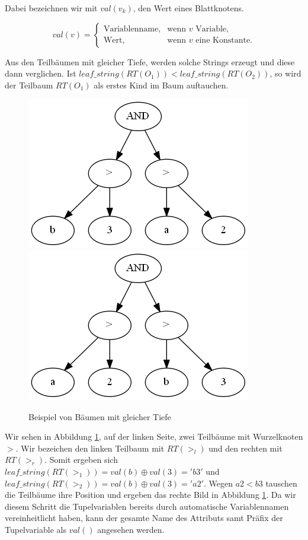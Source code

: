 Dabei bezeichnen wir mit $\mathit{val}(v_k)$, den Wert eines Blattknotens.

$$
val(v)=\begin{cases}
  \text{Variablenname},  & \text{wenn }v\text{ Variable,}\\
  \text{Wert}, & \text{wenn }v\text{ eine Konstante.}
\end{cases}
$$

Aus den Teilbäumen mit gleicher Tiefe, werden solche Strings erzeugt und diese dann verglichen.
Ist $\mathit{leaf\_string}(RT(O_1)) <  \mathit{leaf\_string}(RT(O_2))$, so wird der Teilbaum $RT(O_1)$ als erstes Kind im Baum auftauchen.

\begin{figure}[h]
\includegraphics[scale=0.5]{Bilder/same_depth1.png}         \includegraphics[scale=0.5]{Bilder/same_depth2.png}
\caption{Beispiel von Bäumen mit gleicher Tiefe}
\label{fig:bsp1}
\end{figure}

Wir sehen in Abbildung \ref{fig:bsp1}, auf der linken Seite, zwei Teilbäume mit Wurzelknoten $>$. Wir bezeichen den linken Teilbaum mit $RT(>_l)$ und den rechten mit $RT(>_r)$. Somit ergeben sich $\mathit{leaf\_string}(RT(>_1)) = \mathit{val}(b) \oplus  \mathit{val}(3) = 'b3'$ und 
$\mathit{leaf\_string}(RT(>_2)) = \mathit{val}(b) \oplus  \mathit{val}(3) = 'a2'$. Wegen $\mathit{a2} < \mathit{b3}$ tauschen die Teilbäume ihre Position und ergeben das rechte Bild in Abbildung \ref{fig:bsp1}. Da wir diesem Schritt die Tupelvariablen bereits durch automatische Variablennamen vereinheitlicht haben, kann der gesamte Name des Attributs samt Präfix der Tupelvariable als $\mathit{val()}$ angesehen werden.

